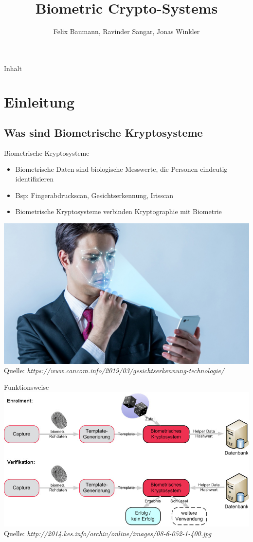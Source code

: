 \documentclass{beamer}
\title{\textbf{\huge{Biometric Crypto-Systems}} \\[1ex]}
\author{Felix Baumann, Ravinder Sangar, Jonas Winkler}
\begin{document}
\begin{frame}
	\titlepage
\end{frame}

\begin{frame}{Inhalt}
	\tableofcontents
\end{frame}

\section{Einleitung}
\subsection{Was sind Biometrische Kryptosysteme}
\begin{frame}{Biometrische Kryptosysteme}
	\begin{itemize}
		\item Biometrische Daten sind biologische Messwerte, die Personen eindeutig identifizieren\\ [2ex]
		\item Bsp: Fingerabdruckscan, Gesichtserkennung, Irisscan \\ [2ex]
		\item Biometrische Kryptosysteme verbinden Kryptographie mit Biometrie \\ [2ex]
	\end{itemize}
	\hspace{19mm}\includegraphics [height = 4 cm ]{gesichtserkennung.jpg} \\
	\hspace{18mm}\tiny{Quelle: \textit{\tiny{https://www.cancom.info/2019/03/gesichtserkennung-technologie/}}}
\end{frame}

\begin{frame}{Funktionsweise}
	\hspace{17mm}\includegraphics [height = 4 cm ]{08-6-052-1.jpg} \\
	\hspace{20mm}\tiny{Quelle: \textit{\tiny{http://2014.kes.info/archiv/online/images/08-6-052-1-400.jpg}}}
\end{frame}
\end{document}
